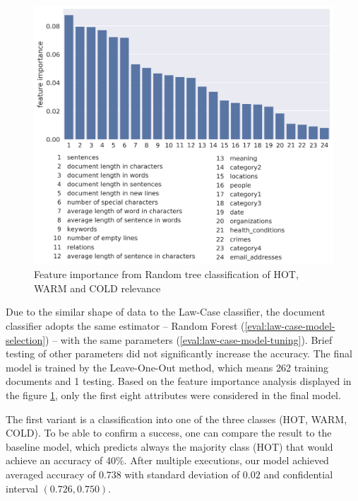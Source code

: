 \documentclass[
  digital, %
  notable,   %
  nolof,     %
  nolot,     %
]{fithesis3}
\begin{document}
\begin{figure}[h]
\caption{Feature importance from Random tree classification of HOT, WARM and COLD relevance}
\label{fig:doc_feature_importance}
\includegraphics[width=\textwidth]{img/doc_feature_importance}
\end{figure}


Due to the similar shape of data to the Law-Case classifier, the document classifier adopts the same estimator -- Random Forest (\ref{eval:law-case-model-selection}) -- with the same parameters (\ref{eval:law-case-model-tuning}).
Brief testing of other parameters did not significantly increase the accuracy.
The final model is trained by the Leave-One-Out method, which means 262 training documents and 1 testing.
Based on the feature importance analysis displayed in the figure \ref{fig:doc_feature_importance}, only the first eight attributes were considered in the final model.

The first variant is a classification into one of the three classes (HOT, WARM, COLD).
To be able to confirm a success, one can compare the result to the baseline model, which predicts always the majority class (HOT) that would achieve an accuracy of 40\%.
After multiple executions, our model achieved averaged accuracy of $0.738$ with standard deviation of $0.02$ and confidential interval $(0.726, 0.750)$.
\end{document}
